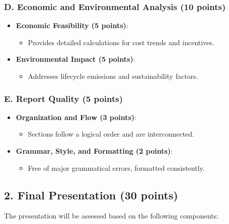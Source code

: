 \documentclass[11pt]{article}
\begin{document}
\subsubsection*{D. Economic and Environmental Analysis (10 points)}
\begin{itemize}
    \item \textbf{Economic Feasibility (5 points)}:
    \begin{itemize}
        \item Provides detailed calculations for cost trends and incentives.
    \end{itemize}
    \item \textbf{Environmental Impact (5 points)}:
    \begin{itemize}
        \item Addresses lifecycle emissions and sustainability factors.
    \end{itemize}
\end{itemize}

\subsubsection*{E. Report Quality (5 points)}
\begin{itemize}
    \item \textbf{Organization and Flow (3 points)}:
    \begin{itemize}
        \item Sections follow a logical order and are interconnected.
    \end{itemize}
    \item \textbf{Grammar, Style, and Formatting (2 points)}:
    \begin{itemize}
        \item Free of major grammatical errors, formatted consistently.
    \end{itemize}
\end{itemize}

\subsection*{2. Final Presentation (30 points)}
The presentation will be assessed based on the following components:
\end{document}
